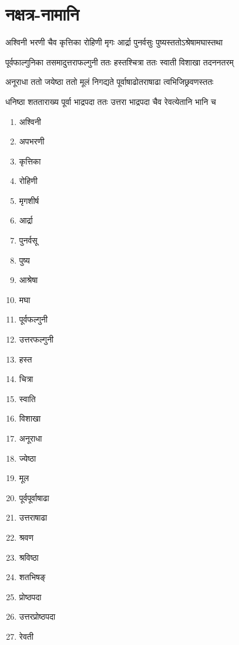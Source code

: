 \section{नक्षत्र-नामानि}
\label{app:nakshatra_names}

\twolineshloka
{अश्विनी भरणी चैव कृत्तिका रोहिणी मृगः}
{आर्द्रा पुनर्वसुः पुष्यस्ततोऽश्रेषामघास्तथा}

\twolineshloka
{पूर्वफाल्गुनिका तसमादुत्तराफल्गुनी ततः}
{हस्तश्चित्रा ततः स्वाती विशाखा तदननतरम्}

\twolineshloka
{अनूराधा ततो जयेष्ठा ततो मूलं निगद्यते}
{पूर्वाषाढोतराषाढा त्वभिजिछ्रवणस्ततः}

\twolineshloka
{धनिष्ठा शतताराख्य पूर्वा भाद्रपदा ततः}
{उत्तरा भाद्रपदा चैव रेवत्येतानि भानि च}


\begin{multicols}{2}
\begin{enumerate}
\item अश्विनी
\item अपभरणी
\item कृत्तिका
\item रोहिणी
\item मृगशीर्ष
\item आर्द्रा
\item पुनर्वसू
\item पुष्य
\item आश्रेषा
\item मघा
\item पूर्वफल्गुनी
\item उत्तरफल्गुनी
\item हस्त
\item चित्रा
\item स्वाति
\item विशाखा
\item अनूराधा
\item ज्येष्ठा
\item मूल
\item पूर्वपूर्वाषाढा
\item उत्तराषाढा
\item श्रवण
\item श्रविष्ठा
\item शतभिषङ्
\item प्रोष्ठपदा
\item उत्तरप्रोष्ठपदा
\item रेवती
\end{enumerate}
\end{multicols}